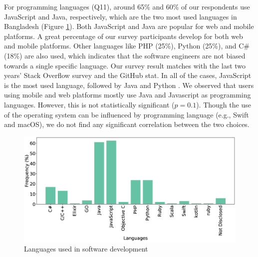 For programming languages (Q11), around 65\% and 60\% of our respondents use JavaScript and
Java, respectively, which are the two most used languages in Bangladesh (Figure
\ref{fig:languages}). Both JavaScript and Java are popular for web and mobile
platforms. A great percentage of our survey participants develop for both
web and mobile platforms. Other languages
like PHP (25\%), Python (25\%), and C\# (18\%) are also used, which indicates
that the software engineers are not biased towards a single specific language.
Our survey result matches with the last two years' Stack Overflow survey and the
GitHub stat. In all of the cases, JavaScript is the most used language, followed
by Java and Python \citep{StackoverflowSurvey2020, StackoverflowSurvey2019,
GithubStat}. We
observed that users using mobile and web platforms mostly use Java and
Javascript as programming languages. However, this is not statistically
significant ($p=0.1$). Though the use of the operating system can be influenced by
programming language (e.g., Swift and macOS), we do not find any significant correlation
between the two choices.
\begin{figure}[t]
\centering
  \includegraphics[scale=0.18]{Figures/Respondents_languages}
  \caption{Languages used in software development}
  \label{fig:languages}
\end{figure}

